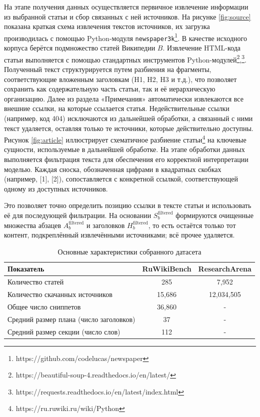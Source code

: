 \documentclass{article}
\begin{document}
На этапе получения данных осуществляется первичное извлечение информации из выбранной статьи и сбор связанных с ней источников. На рисунке \ref{fig:source} показана краткая схема извлечения текстов источников, 
их загрузка производилась с помощью Python-модуля \texttt{newspaper3k}\footnote{https://github.com/codelucas/newspaper}.
В качестве исходного корпуса берётся подмножество статей Википедии \(B\).
Извлечение HTML-кода статьи выполняется с помощью стандартных инструментов Python-модулей\footnote{https://beautiful-soup-4.readthedocs.io/en/latest/},\footnote{https://requests.readthedocs.io/en/latest/index.html}. 
Полученный текст структурируется путем разбиения на фрагменты, соответствующие вложенным заголовкам (H1, H2, H3 и т.д.), что позволяет сохранить как содержательную часть статьи, так и её иерархическую организацию. 
Далее из раздела «Примечания» автоматически извлекаются все внешние ссылки, на которые ссылается статья. Недействительные ссылки (например, код 404) исключаются из дальнейшей обработки,
а связанный с ними текст удаляется, оставляя только те источники, которые действительно доступны.
Рисунок \ref{fig:article} иллюстрирует схематичное разбиение статьи\footnote{https://ru.ruwiki.ru/wiki/Python} на ключевые сущности, используемые в дальнейшей обработке.
На этапе обработки данных выполняется фильтрация текста для обеспечения его корректной интерпретации моделью. 
Каждая сноска, обозначенная цифрами в квадратных скобках (например, [1], [2]), сопоставляется с конкретной ссылкой, соответствующей одному из доступных источников. 

Это позволяет точно определить позицию ссылки в тексте статьи и использовать её для последующей фильтрации. 
На основании \(S_b^{\mathrm{filtered}}\) формируются очищенные множества абзацев \(A_b^{\mathrm{filtered}}\) и заголовков \(H_b^{\mathrm{filtered}}\), 
то есть остаётся только тот контент, подкреплённый извлечёнными источниками; всё прочее удаляется. 

\begin{table}[ht!]
  \centering
  \caption{Основные характеристики собранного датасета}
  \label{tab:dataset}
  \begin{tabular}{lcc}
    \hline
    \textbf{Показатель} & \textbf{RuWikiBench} & \textbf{ResearchArena} \\
    \hline
    Количество статей                             & 285 & 7,952\\
    \hline
    Количество скачанных источников               & 15,686 & 12,034,505\\
    \hline
    Общее число сниппетов                         & 36,860 & -\\
    \hline
    Средний размер плана (число заголовков)       & 37 & -\\
    \hline
    Средний размер секции (число слов)            & 112 & -\\
    \hline
  \end{tabular}
\end{table}
\end{document}
